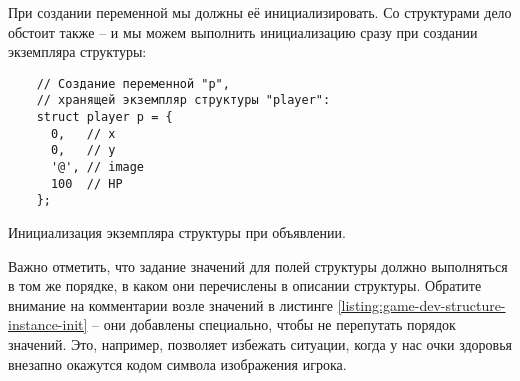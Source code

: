 \documentclass[../sparc.tex]{subfiles}
\begin{document}
При создании переменной мы должны её инициализировать.  Со структурами дело
обстоит также -- и мы можем выполнить инициализацию сразу при создании экземпляра
структуры:

\begin{listing}[H]
  \begin{verbatim}
    // Создание переменной "p",
    // хранящей экземпляр структуры "player":
    struct player p = {
      0,   // x
      0,   // y
      '@', // image
      100  // HP
    };
  \end{verbatim}
  \caption{Инициализация экземпляра структуры при объявлении.}
  \label{listing:game-dev-structure-instance-init}
\end{listing}

Важно отметить, что задание значений для полей структуры должно выполняться в
том же порядке, в каком они перечислены в описании структуры.  Обратите внимание
на комментарии возле значений в листинге
\ref{listing:game-dev-structure-instance-init} -- они добавлены специально, чтобы
не перепутать порядок значений.  Это, например, позволяет избежать ситуации,
когда у нас очки здоровья внезапно окажутся кодом символа изображения игрока.
\end{document}
